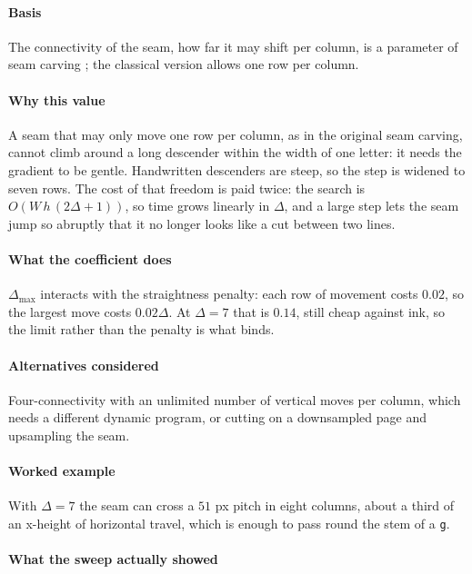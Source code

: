 \paragraph{Basis}

The connectivity of the seam, how far it may shift per column, is a parameter of seam carving \cite[10:3]{avidan2007}; the classical version allows one row per column.

\paragraph{Why this value}

A seam that may only move one row per column, as in the original seam carving, cannot climb around a long descender within the width of one letter: it needs the gradient to be gentle. Handwritten descenders are steep, so the step is widened to seven rows. The cost of that freedom is paid twice: the search is $O(W\,h\,(2\Delta+1))$, so time grows linearly in $\Delta$, and a large step lets the seam jump so abruptly that it no longer looks like a cut between two lines.

\paragraph{What the coefficient does}

$\Delta_{\max}$ interacts with the straightness penalty: each row of movement costs $0.02$, so the largest move costs $0.02\Delta$. At $\Delta = 7$ that is $0.14$, still cheap against ink, so the limit rather than the penalty is what binds.

\paragraph{Alternatives considered}

Four-connectivity with an unlimited number of vertical moves per column, which needs a different dynamic program, or cutting on a downsampled page and upsampling the seam.

\paragraph{Worked example}

With $\Delta = 7$ the seam can cross a $51$ px pitch in eight columns, about a third of an x-height of horizontal travel, which is enough to pass round the stem of a \texttt{g}.

\paragraph{What the sweep actually showed}

